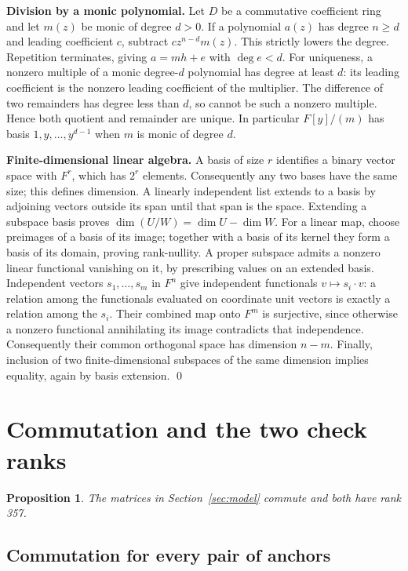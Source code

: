 \documentclass{article}
\newtheorem{proposition}{Proposition}
\begin{document}
\textbf{Division by a monic polynomial.} Let \(D\) be a commutative coefficient
ring and let \(m(z)\) be monic of degree \(d>0\). If a polynomial \(a(z)\) has
degree \(n\ge d\) and leading coefficient \(c\), subtract \(cz^{n-d}m(z)\).
This strictly lowers the degree. Repetition terminates, giving
\(a=mh+e\) with \(\deg e<d\). For uniqueness, a nonzero multiple of a monic
degree-\(d\) polynomial has degree at least \(d\): its leading coefficient
is the nonzero leading coefficient of the multiplier. The difference of
two remainders has degree less than \(d\), so cannot be such a nonzero
multiple. Hence both quotient and remainder are unique. In particular
\(F[y]/(m)\) has basis \(1,y,\dots,y^{d-1}\) when \(m\) is monic of degree \(d\).

\textbf{Finite-dimensional linear algebra.} A basis of size \(r\) identifies a
binary vector space with \(F^r\), which has \(2^r\) elements. Consequently any
two bases have the same size; this defines dimension. A linearly independent
list extends to a basis by adjoining vectors outside its span until that span
is the space. Extending a subspace basis proves
\(\dim(U/W)=\dim U-\dim W\). For a linear map, choose preimages of a basis of
its image; together with a basis of its kernel they form a basis of its
domain, proving rank-nullity. A proper subspace admits a nonzero linear
functional vanishing on it, by prescribing values on an extended basis.
Independent vectors \(s_1,\dots,s_m\) in \(F^n\) give independent functionals
\(v\mapsto s_i\cdot v\): a relation among the functionals evaluated on
coordinate unit vectors is exactly a relation among the \(s_i\).
Their combined map onto \(F^m\) is surjective, since otherwise a nonzero
functional annihilating its image contradicts that independence.
Consequently their common orthogonal space has dimension \(n-m\).
Finally, inclusion of two finite-dimensional subspaces of the same
dimension implies equality, again by basis extension. \qed

\section{Commutation and the two check ranks}\label{sec:ranks}

\begin{proposition}\label{prop:ranks}
  The matrices in Section~\ref{sec:model} commute and both have rank 357.
\end{proposition}

\subsection{Commutation for every pair of anchors}\label{sec:commutation}
\end{document}
